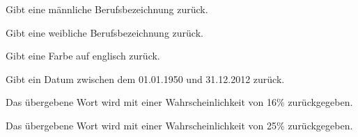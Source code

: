 \documentclass[a4paper,12pt,oneside]{sphinxmanual}
\begin{document}
\begin{fulllineitems}
\label{funktionen:pyzufall.beruf_m}
Gibt eine männliche Berufsbezeichnung zurück.

\end{fulllineitems}


\begin{fulllineitems}
\label{funktionen:pyzufall.beruf_w}
Gibt eine weibliche Berufsbezeichnung zurück.

\end{fulllineitems}


\begin{fulllineitems}
\label{funktionen:pyzufall.color}
Gibt eine Farbe auf englisch zurück.

\end{fulllineitems}


\begin{fulllineitems}
\label{funktionen:pyzufall.datum}
Gibt ein Datum zwischen dem 01.01.1950 und 31.12.2012 zurück.

\end{fulllineitems}


\begin{fulllineitems}
\label{funktionen:pyzufall.e16}
Das übergebene Wort wird mit einer Wahrscheinlichkeit von 16\% zurückgegeben.

\end{fulllineitems}


\begin{fulllineitems}
\label{funktionen:pyzufall.e25}
Das übergebene Wort wird mit einer Wahrscheinlichkeit von 25\% zurückgegeben.

\end{fulllineitems}
\end{document}
